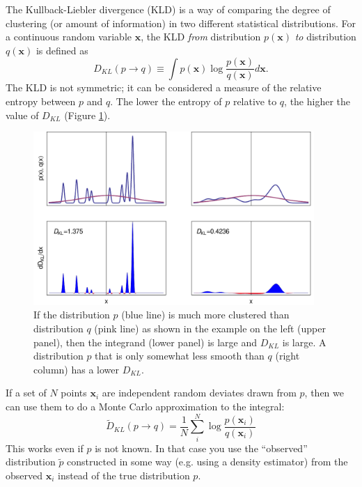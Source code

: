 \documentclass[useAMS,usenatbib,a4paper]{mn2e}
\begin{document}
The Kullback-Liebler divergence (KLD) is a way of comparing the degree of clustering (or amount of information) in two different statistical distributions. For a continuous random variable $\mathbf{x}$, the KLD \emph{from} distribution $p(\mathbf{x})$ \emph{to} distribution $q(\mathbf{x})$ is defined as
\begin{equation}
 D_{KL}(p\to q) \equiv \int p(\mathbf{x}) \log \frac{p(\mathbf{x})}{q(\mathbf{x})} d\mathbf{x}.
\end{equation}
The KLD is not symmetric; it can be considered a measure of the relative entropy between $p$ and $q$. The lower the entropy of $p$ relative to $q$, the higher the value of $D_{KL}$ (Figure \ref{fig:1Dexample}).
\begin{figure}
 \includegraphics[width=0.95\textwidth]{KLDiv_1D_Example}
\caption{If the distribution $p$ (blue line) is much more clustered than distribution $q$ (pink line) as shown in the example on the left (upper panel), then the integrand (lower panel) is large and $D_{KL}$ is large. A distribution $p$ that is only somewhat less smooth than $q$ (right column) has a lower $D_{KL}$.}
\label{fig:1Dexample}
\end{figure}

If a set of $N$ points $\mathbf{x}_i$ are independent random deviates drawn from $p$, then we can use them to do a Monte Carlo approximation to the integral:
\begin{equation}
  \tilde{D}_{KL}(p\to q) = \frac{1}{N} \sum_{i}^{N} \log \frac{p(\mathbf{x}_i)}{q(\mathbf{x}_i)}
\end{equation}
This works even if $p$ is not known. In that case you use the ``observed'' distribution $\tilde{p}$ constructed in some way (e.g. using a density estimator) from the observed $\mathbf{x}_i$ instead of the true distribution $p$. 
\end{document}
